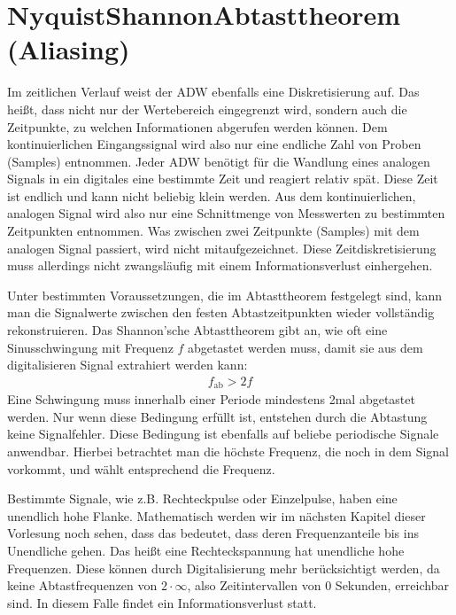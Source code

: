\documentclass[letterpaper,10pt,english]{jupyterBook}
\begin{document}
\section{Nyquist\sphinxhyphen{}Shannon\sphinxhyphen{}Abtasttheorem (Aliasing) }
\label{\detokenize{content/2_Digital:nyquist-shannon-abtasttheorem-aliasing-a-id-subsec-nyquist-shannon-abtasttheorem-a}}
\sphinxAtStartPar
Im zeitlichen Verlauf weist der ADW ebenfalls eine Diskretisierung auf.
Das heißt, dass nicht nur der Wertebereich eingegrenzt wird, sondern auch die Zeitpunkte, zu welchen Informationen abgerufen werden können. Dem kontinuierlichen Eingangssignal wird also nur eine endliche Zahl von Proben (Samples) entnommen.
Jeder ADW benötigt für die Wandlung eines analogen Signals in ein digitales eine bestimmte Zeit und reagiert relativ spät. Diese Zeit ist endlich und kann nicht beliebig klein werden. Aus dem kontinuierlichen, analogen Signal wird also nur eine Schnittmenge von Messwerten zu bestimmten Zeitpunkten entnommen. Was zwischen zwei Zeitpunkte (Samples) mit dem analogen Signal passiert, wird nicht mitaufgezeichnet. Diese Zeitdiskretisierung muss allerdings nicht zwangsläufig mit einem Informationsverlust einhergehen.

\sphinxAtStartPar
Unter bestimmten Voraussetzungen, die im Abtasttheorem festgelegt sind, kann man die Signalwerte zwischen den festen Abtastzeitpunkten wieder vollständig rekonstruieren. Das Shannon’sche Abtasttheorem gibt an, wie oft eine Sinusschwingung mit Frequenz \(f\) abgetastet werden muss, damit sie aus dem digitalisieren Signal extrahiert werden kann:
\begin{equation*}
\begin{split}f_\mathrm{ab} > 2f\end{split}
\end{equation*}
\sphinxAtStartPar
Eine Schwingung muss innerhalb einer Periode mindestens 2\sphinxhyphen{}mal abgetastet werden.
Nur wenn diese Bedingung erfüllt ist, entstehen durch die Abtastung keine Signalfehler.
Diese Bedingung ist ebenfalls auf beliebe periodische Signale anwendbar. Hierbei betrachtet man die höchste Frequenz, die noch in dem Signal vorkommt, und wählt entsprechend die \sphinxhyphen{}Frequenz.

\sphinxAtStartPar
Bestimmte Signale, wie z.B. Rechteckpulse oder Einzelpulse, haben eine unendlich hohe Flanke. Mathematisch werden wir im nächsten Kapitel dieser Vorlesung noch sehen, dass das bedeutet, dass deren Frequenzanteile bis ins Unendliche gehen. Das heißt eine Rechteckspannung hat unendliche hohe Frequenzen. Diese können durch Digitalisierung  mehr berücksichtigt werden, da keine Abtastfrequenzen von \(2\cdot \infty\), also Zeitintervallen von 0 Sekunden, erreichbar sind. In diesem Falle findet ein Informationsverlust statt.
\end{document}
